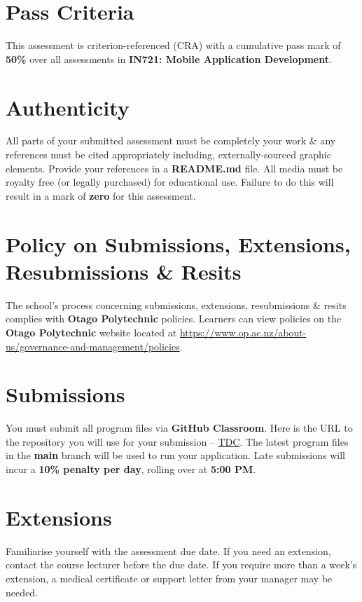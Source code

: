 \documentclass{article}
\begin{document}
\section*{Pass Criteria}
This assessment is criterion-referenced (CRA) with a cumulative pass mark of \textbf{50\%} over all assessments in \textbf{IN721: Mobile Application Development}.

\section*{Authenticity}
All parts of your submitted assessment must be completely your work \& any references must be cited appropriately including, externally-sourced graphic elements. Provide your references in a \textbf{README.md} file. All media must be royalty free (or legally purchased) for educational use. Failure to do this will result in a mark of \textbf{zero} for this assessment.

\section*{Policy on Submissions, Extensions, Resubmissions \& Resits}
The school's process concerning submissions, extensions, resubmissions \& resits complies with \textbf{Otago Polytechnic} policies. Learners can view policies on the \textbf{Otago Polytechnic} website located at \href{https://www.op.ac.nz/about-us/governance-and-management/policies}{https://www.op.ac.nz/about-us/governance-and-management/policies}.

\section*{Submissions}
You must submit all program files via \textbf{GitHub Classroom}. Here is the URL to the repository you will use for your submission – \href{TDC}{TDC}. The latest program files in the \textbf{main} branch will be used to run your application. Late submissions will incur a \textbf{10\% penalty per day}, rolling over at \textbf{5:00 PM}.

\section*{Extensions}
Familiarise yourself with the assessment due date. If you need an extension, contact the course lecturer before the due date. If you require more than a week's extension, a medical certificate or support letter from your manager may be needed.
\end{document}
